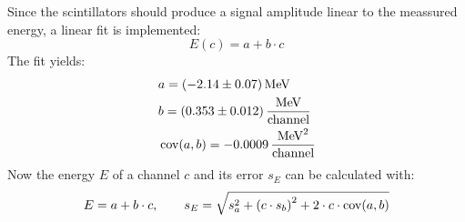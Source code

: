 Since the scintillators should produce a signal amplitude linear to the meassured energy, a linear fit is implemented:
\begin{equation}
    E(c) = a + b \cdot c
\end{equation}
The fit yields:
\begin{equation}
    \begin{split}
        & a = (-2.14 \pm 0.07) \, \text{MeV} \\
        & b = (0.353 \pm 0.012) \, \frac{\text{MeV}}{\text{channel}} \\
        & \operatorname{cov}(a, b) = -0.0009 \, \frac{\text{MeV}^2}{\text{channel}} 
    \end{split}
\end{equation}
Now the energy $E$ of a channel $c$ and its error $s_E$ can be calculated with:
\begin{equation}
\label{eq:ecalibration}
    E = a + b \cdot c, \qquad s_E = \sqrt{s_a^2 + \left(c \cdot s_b \right)^2 + 2 \cdot c \cdot \operatorname{cov}(a,b)}
\end{equation}

